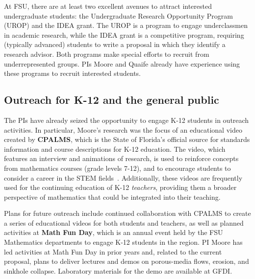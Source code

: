 \documentclass[11pt]{article}
\begin{document}
At FSU, there are at least two excellent avenues to attract interested undergraduate students:  the Undergraduate Research Opportunity Program (UROP) and the IDEA grant. The UROP is a program to engage underclassmen in academic research, while the IDEA grant is a competitive program, requiring (typically advanced) students to write a proposal in which they identify a research advisor. Both programs make special efforts to recruit from underrepresented groups. PIs Moore and Quaife already have experience using these programs to recruit interested students.

\subsection{Outreach for K-12 and the general public}

The PIs have already seized the opportunity to engage K-12 students in outreach activities. In particular, Moore's research was the focus of an educational video created by {\bf CPALMS}, which is the State of Florida's official source for standards information and course descriptions for K-12 education. The video, which features an interview and animations of research, is used to reinforce concepts from mathematics courses (grade levels 7-12), and to encourage students to consider a career in the STEM fields~\cite{CPALMS}. Additionally, these videos are frequently used for the continuing education of K-12 {\em teachers}, providing them a broader perspective of mathematics that could be integrated into their teaching.
 
Plans for future outreach include continued collaboration with CPALMS to create a series of educational videos for both students and teachers, as well as planned activities at {\bf Math Fun Day}, which is an annual event held by the FSU Mathematics departments to engage K-12 students in the region. PI Moore has led activities at Math Fun Day in prior years and, related to the current proposal, plans to deliver lectures and demos on porous-media flows, erosion, and sinkhole collapse. Laboratory materials for the demo are available at GFDI.
\end{document}
